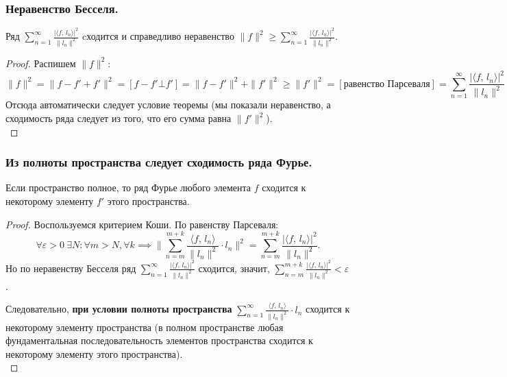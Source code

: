\subsubsection{Неравенство Бесселя.\label{subsubsec:label2}}
\begin{theorem*}
    Ряд $\sum_{n=1}^\infty \frac{\lvert \langle f,\, l_n \rangle \rvert^2}{\| l_n \|^2}$ cходится и справедливо неравенство $\| f \|^2 \geq \sum_{n=1}^\infty \frac{\lvert \langle f,\, l_n \rangle \rvert^2}{\| l_n \|^2}$.
\end{theorem*}
\begin{proof}
    Распишем $\| f \|^2$:
    \[\| f \|^2 = \| f - f' + f' \|^2 = [f - f' \bot f'] = \| f - f' \|^2 + \| f' \|^2 \geq \| f' \|^2 = [\text{равенство Парсеваля}] = \sum_{n=1}^\infty \frac{\lvert \langle f,\, l_n \rangle \rvert^2}{\| l_n \|^2}\]
    Отсюда автоматически следует условие теоремы (мы показали неравенство, а сходимость ряда следует из того, что его сумма равна $\| f' \|^2$).\\
\end{proof}

\subsubsection{Из полноты пространства следует сходимость ряда Фурье.}
\begin{theorem*}
    Если пространство полное, то ряд Фурье любого элемента $f$ сходится к некоторому элементу $f'$ этого пространства.
\end{theorem*}
\begin{proof}
    Воспользуемся критерием Коши. По равенству Парсеваля: 
    \[\forall \varepsilon > 0\ \exists N: \forall m > N, \forall k \implies \| \sum_{n=m}^{m+k} \frac{\langle f,\, l_n \rangle}{\| l_n \|^2} \cdot l_n \|^2 = \sum_{n=m}^{m+k} \frac{\lvert \langle f,\, l_n \rangle \rvert^2}{\| l_n \|^2}.\]
    Но по неравенству Бесселя ряд $\sum_{n=1}^\infty \frac{\lvert \langle f,\, l_n \rangle \rvert^2}{\| l_n \|^2}$ сходится, значит, $\sum_{n=m}^{m+k} \frac{\lvert \langle f,\, l_n \rangle \rvert^2}{\| l_n \|^2} < \varepsilon$.

    Следовательно, \textbf{при условии полноты пространства} $\sum_{n=1}^\infty \frac{\langle f,\, l_n \rangle}{\| l_n \|^2} \cdot l_n$ сходится к некоторому элементу пространства  (в полном пространстве любая фундаментальная последовательность элементов пространства сходится к некоторому элементу этого пространства).\\  
\end{proof}


